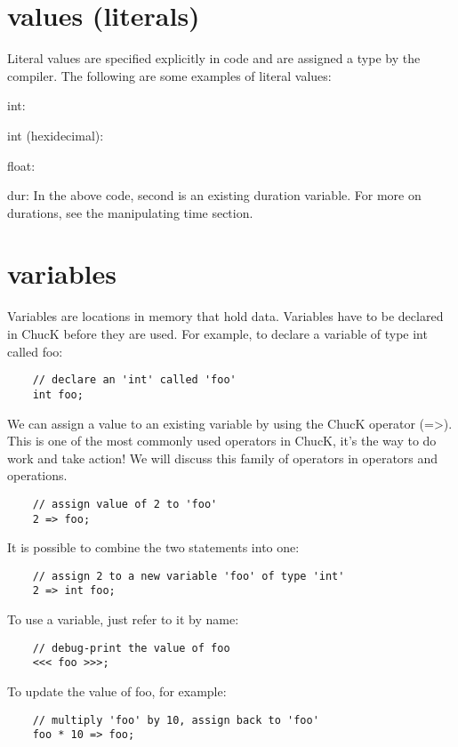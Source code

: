 \section{values (literals)}

Literal values are specified explicitly in code and are assigned a type by the compiler. The following are some examples of literal values:

int:

int (hexidecimal):

float:

dur:
 In the above code, second is an existing duration variable. For more on durations, see the manipulating time section.
 

\section{variables}

Variables are locations in memory that hold data. Variables have to be declared in ChucK before they are used. For example, to declare a variable of type int called foo:
\begin{verbatim}
    // declare an 'int' called 'foo'
    int foo;
\end{verbatim}

We can assign a value to an existing variable by using the ChucK operator (=>). This is one of the most commonly used operators in ChucK, it's the way to do work and take action! We will discuss this family of operators in operators and operations.
\begin{verbatim}
    // assign value of 2 to 'foo'
    2 => foo;
\end{verbatim}

It is possible to combine the two statements into one:
\begin{verbatim}
    // assign 2 to a new variable 'foo' of type 'int'
    2 => int foo;
\end{verbatim}

To use a variable, just refer to it by name:
\begin{verbatim}
    // debug-print the value of foo
    <<< foo >>>;
\end{verbatim}

To update the value of foo, for example:
\begin{verbatim}
    // multiply 'foo' by 10, assign back to 'foo'
    foo * 10 => foo;
\end{verbatim}


